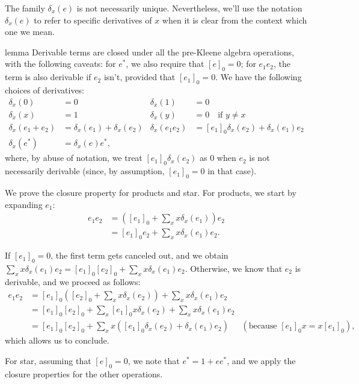 \documentclass[a4paper,UKenglish,cleveref, autoref, thm-restate]{lipics-v2021}
\begin{document}
The family $ \delta _x(e)$ is not necessarily unique.  Nevertheless, we'll use the
notation $ \delta _x(e)$ to refer to specific derivatives of $x$ when it is clear from
the context which one we mean.

\begin{theoremEnd}{lemma}
  \label{lem:derivable-closure}
  Derivable terms are closed under all the pre-Kleene algebra operations, with
  the following caveats: for $e^*$, we also require that $[e]_0 = 0$; for
  $e_1e_2$, the term is also derivable if $e_2$ isn't, provided that
  $[e_1]_0=0$.  We have the following choices of derivatives:
  \begin{align*}
     \delta _x(0) & = 0 &
     \delta _x(1) & = 0 \\
     \delta _x(x) & = 1 &
     \delta _x(y) & = 0 \quad \text{if $y  \neq  x$} \\
     \delta _x(e_1 + e_2) & =  \delta _x(e_1) +  \delta _x(e_2) &
     \delta _x(e_1e_2) & = [e_1]_0 \delta _x(e_2) +  \delta _x(e_1)e_2 \\
     \delta _x(e^*) & =  \delta _x(e)e^*,
  \end{align*}
  where, by abuse of notation, we treat $[e_1]_0 \delta _x(e_2)$ as 0 when $e_2$ is not
  necessarily derivable (since, by assumption, $[e_1]_0 = 0$ in that case).
\end{theoremEnd}

\begin{proofEnd} %
%
  We prove the closure property for products and star. For products, we start by
  expanding $e_1$:
  \begin{align*}
    e_1e_2
    & = \left([e_1]_0 +  \sum _x x \delta _x(e_1)\right)e_2 \\
    & = [e_1]_0e_2 +  \sum _x x \delta _x(e_1)e_2.
  \end{align*}

  If $[e_1]_0=0$, the first term gets canceled out, and we obtain
  $ \sum _xx \delta _x(e_1)e_2 = [e_1]_0[e_2]_0 +  \sum _xx \delta _x(e_1)e_2$.  Otherwise, we know that
  $e_2$ is derivable, and we proceed as follows:
  \begin{align*}
    e_1e_2
    & = [e_1]_0\left([e_2]_0 +  \sum _x x  \delta _x(e_2)\right) +  \sum _x x \delta _x(e_1)e_2 \\
    & = [e_1]_0[e_2]_0 +  \sum _x [e_1]_0 x  \delta _x(e_2) +  \sum _x x \delta _x(e_1)e_2 \\
    & = [e_1]_0[e_2]_0 +  \sum _x x ([e_1]_0 \delta _x(e_2) +  \delta _x(e_1)e_2)
    & (\text{because $[e_1]_0x = x[e_1]_0$}),
  \end{align*}
  which allows us to conclude.

  For star, assuming that $[e]_0 = 0$, we note that $e^* = 1 + ee^*$, and we
  apply the closure properties for the other operations. %
\end{proofEnd}
\end{document}
